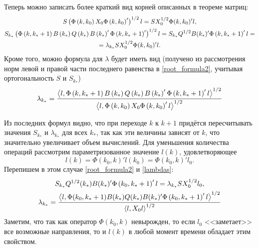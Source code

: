 \documentclass[10pt, a4paper]{article}
\begin{document}
Теперь можно записать более краткий вид корней описанных в теореме матриц: 
\begin{gather}
	\label{root_formula1} S\left(\Phi\left(k,k_0\right)X_0\Phi\left(k,k_0\right)'\right)^{1/2}l =
		SX_0^{1/2}\Phi(k,k_0)'l, \\ 
	\notag S_{k_*}\left(\Phi\left(k,k_*+1\right)B\left(k_*\right)Q\left(k_*\right)B\left(k_*\right)'\Phi\left(k,k_*+1\right)'\right)^{1/2}l 
		=  S_{k_*}Q^{1/2}B(k_*)'\Phi\left(k,k_*+1\right)'l = \\
		\label{root_formula2} = \lambda_{k_*} SX_0^{1/2}\Phi(k,k_0)'l.
\end{gather}
Кроме того, можно формула для $\lambda$ будет иметь вид (получено из рассмотрения норм левой и правой части последнего равенства в \eqref{root_formula2}, учитывая ортогональность $S$ и $S_{k_*}$)
\begin{equation}\label{lambdas}
	\lambda_{k_*} = \frac {\left<l,\Phi\left(k,k_*+1\right)B\left(k_*\right)Q\left(k_*\right)B\left(k_*\right)'\Phi\left(k,k_*+1\right)'l\right>^{1/2}}{\left<l,\Phi\left(k,k_0\right)X_0\Phi\left(k,k_0\right)'l\right>^{1/2}}
\end{equation}
\begin{note}
Из последних формул видно, что при переходе $k$ к $k+1$ придётся пересчитывать значения $S_{k_*}$ и $\lambda_{k_*}$ для всех $k_*$, так как эти величины зависят от $k$, что значительно увеличивает объем вычислений. Для уменьшения количества операций рассмотрим параметризованное значение $l(k)$, удовлетворяющее 
	\begin{equation}\label{newl}
		l(k)=\Phi(k_0,k)'l(k_0) = \Phi(k_0,k)'l_0.
	\end{equation}
	Перепишем в этом случае \eqref{root_formula2} и \eqref{lambdas}:
	\begin{gather}\label{new_lambdas}
		S_{k_*}Q^{1/2}(k_*)B(k_*)'\Phi\left(k_0,k_*+1\right)'l = \lambda_{k_*}SX_0^{1/2}l_0, \\
		\lambda_{k_*} =
			 \frac{\left<l,\Phi(k_0,k_*+1)B(k_*)Q(k_*)B(k_*)'\Phi\left(k_0,k_*+1\right)'l\right>^{1/2} }
			{\left<l,X_0l\right>^{1/2} }
	\end{gather}	
	Заметим, что так как оператор $\Phi(k_0,k)$ невырожден, то если $l_0$ <<заметает>>  все возможные направления, то и $l(k)$ в любой момент времени обладает этим свойством.
\end{note}
\end{document}
